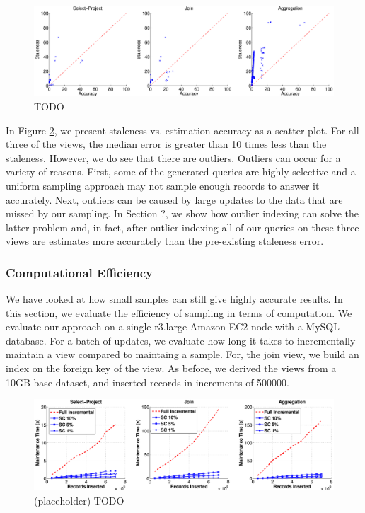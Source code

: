 \begin{figure}[ht!]
\label{exp3dist}
\centering
 \includegraphics[width=\textwidth]{exp/exp3-query-error-dist.eps}
 \caption{TODO}
\end{figure}

In Figure \ref{exp3dist}, we present staleness vs. estimation accuracy as a scatter plot.
For all three of the views, the median error is greater than 10 times less than the staleness. 
However, we do see that there are outliers.
Outliers can occur for a variety of reasons.
First, some of the generated queries are highly selective and a uniform sampling approach may not sample enough records to answer it accurately.
Next, outliers can be caused by large updates to the data that are missed by our sampling.
In Section ?, we show how outlier indexing can solve the latter problem and, in fact, after outlier indexing all of our queries on these three views are estimates more accurately than the pre-existing staleness error.

\subsubsection{Computational Efficiency}
We have looked at how small samples can still give highly accurate results.
In this section, we evaluate the efficiency of sampling in terms of computation.
We evaluate our approach on a single r3.large Amazon EC2 node with a MySQL database.
For a batch of updates, we evaluate how long it takes to incrementally maintain a view compared to maintaing a sample.
For, the join view, we build an index on the foreign key of the view.
As before, we derived the views from a 10GB base dataset, and inserted records in increments of 500000.

\begin{figure}[ht!]
\label{exp3dist}
\centering
\includegraphics[width=\textwidth]{exp/exp4-efficiency-tpcd-skew.eps}
 \caption{(placeholder) TODO}
\end{figure}

